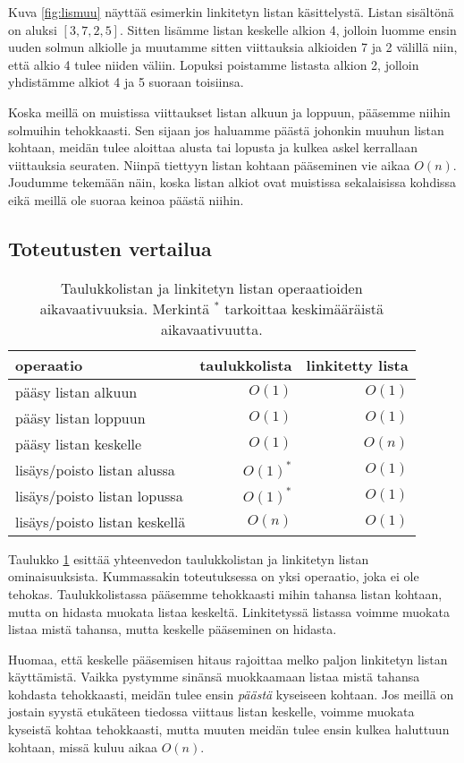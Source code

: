 Kuva \ref{fig:lismuu} näyttää esimerkin linkitetyn listan käsittelystä.
Listan sisältönä on aluksi $[3,7,2,5]$.
Sitten lisämme listan keskelle alkion 4,
jolloin luomme ensin uuden solmun alkiolle ja muutamme
sitten viittauksia alkioiden 7 ja 2 välillä niin,
että alkio 4 tulee niiden väliin.
Lopuksi poistamme listasta alkion 2, jolloin yhdistämme
alkiot 4 ja 5 suoraan toisiinsa.

Koska meillä on muistissa viittaukset listan alkuun ja loppuun,
pääsemme niihin solmuihin tehokkaasti.
Sen sijaan jos haluamme päästä johonkin muuhun listan kohtaan,
meidän tulee aloittaa alusta tai lopusta ja kulkea askel
kerrallaan viittauksia seuraten.
Niinpä tiettyyn listan kohtaan pääseminen vie aikaa $O(n)$.
Joudumme tekemään näin, koska listan alkiot ovat muistissa
sekalaisissa kohdissa eikä meillä ole suoraa keinoa päästä niihin.

\subsection{Toteutusten vertailua}

\begin{table}
\center
\begin{tabular}{lrr}
operaatio & taulukkolista & linkitetty lista \\
\hline
pääsy listan alkuun & $O(1)$ & $O(1)$ \\
pääsy listan loppuun & $O(1)$ & $O(1)$ \\ 
pääsy listan keskelle &  $O(1)$ & $O(n)$ \\
lisäys/poisto listan alussa & $O(1)^*$ & $O(1)$ \\
lisäys/poisto listan lopussa & $O(1)^*$ & $O(1)$ \\ 
lisäys/poisto listan keskellä &  $O(n)$ & $O(1)$ \\
\end{tabular}
\caption{Taulukkolistan ja linkitetyn listan operaatioiden
aikavaativuuksia. Merkintä $^*$ tarkoittaa keskimääräistä aikavaativuutta.}
\label{tab:taulin}
\end{table}

Taulukko \ref{tab:taulin} esittää yhteenvedon taulukkolistan ja
linkitetyn listan ominaisuuksista.
Kummassakin toteutuksessa on yksi operaatio,
joka ei ole tehokas.
Taulukkolistassa pääsemme tehokkaasti mihin tahansa listan
kohtaan, mutta on hidasta muokata listaa keskeltä.
Linkitetyssä listassa voimme muokata listaa mistä tahansa,
mutta keskelle pääseminen on hidasta.

Huomaa, että keskelle pääsemisen hitaus rajoittaa melko paljon
linkitetyn listan käyttämistä.
Vaikka pystymme sinänsä muokkaamaan listaa mistä tahansa kohdasta
tehokkaasti, meidän tulee ensin \emph{päästä} kyseiseen kohtaan.
Jos meillä on jostain syystä etukäteen tiedossa viittaus listan keskelle,
voimme muokata kyseistä kohtaa tehokkaasti,
mutta muuten meidän tulee ensin kulkea haluttuun kohtaan,
missä kuluu aikaa $O(n)$.

